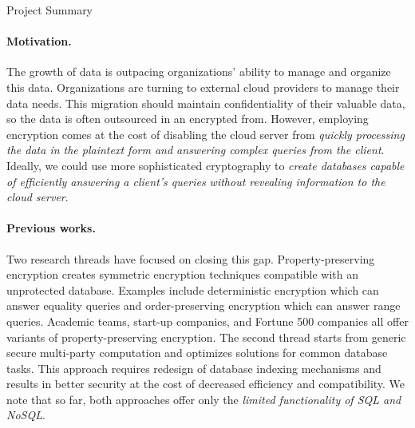 \documentclass[11pt]{article}
\begin{document}
\begin{center}
\LARGE
Project Summary 
\end{center}

\vspace{-1.5em}
\noindent \hrulefill



\paragraph{Motivation.}
%
The growth of data is outpacing organizations' ability to manage and
organize this data. Organizations are turning to external cloud providers
to manage their data needs.  
%
This migration should maintain confidentiality of their
valuable data, so the data is often outsourced in an encrypted from. 
%
However, employing encryption comes at the cost of disabling the cloud server
from {\em quickly processing the data in the plaintext form and answering
complex queries from the client}. 
%
Ideally, we could use more sophisticated cryptography to {\em create databases
capable of efficiently answering a client's queries without revealing
information to the cloud server}.  

\paragraph{Previous works.}
Two research threads have focused on closing this gap.
Property-preserving encryption creates symmetric encryption techniques
compatible with an unprotected database. Examples include deterministic
encryption which can answer equality queries and order-preserving encryption
which can answer range queries. Academic teams, start-up companies, and Fortune
500 companies all offer variants of property-preserving encryption.
%
The second thread starts from generic secure multi-party computation and
optimizes solutions for common database tasks. This approach requires redesign
of database indexing mechanisms and results in better security at the cost of
decreased efficiency and compatibility. 
%
We note that so far, both approaches offer only the {\em limited functionality
of SQL and NoSQL}. 
\end{document}
